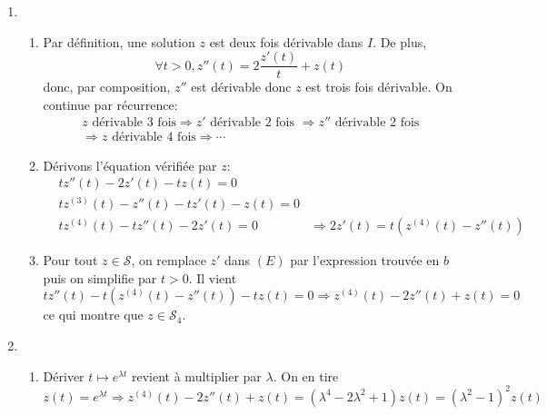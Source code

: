 \begin{enumerate}
  \item 
\begin{enumerate}
  \item Par définition, une solution $z$ est deux fois dérivable dans $I$. De plus,
\begin{displaymath}
  \forall t>0, z''(t) = 2\frac{z'(t)}{t} + z(t)
\end{displaymath}
donc, par composition, $z''$ est dérivable donc $z$ est trois fois dérivable. On continue par récurrence:
\begin{multline*}
  z \text{ dérivable 3 fois} \Rightarrow z' \text{ dérivable 2 fois } \Rightarrow z'' \text{ dérivable 2 fois} \\
  \Rightarrow z \text{ dérivable 4 fois} \Rightarrow \cdots
\end{multline*}

  \item Dérivons l'équation vérifiée par $z$:
\begin{align*}
  &tz''(t) - 2z'(t) - tz(t) = 0& \\
  &tz^{(3)}(t) - z''(t) -tz'(t) -z(t) = 0& \\
  &tz^{(4)}(t) - tz''(t) -2 z'(t) = 0& \Rightarrow 2z'(t) = t\left( z^{(4)}(t) - z''(t)\right) 
\end{align*}

  \item Pour tout $z\in \mathcal{S}$, on remplace $z'$ dans $(E)$ par l'expression trouvée en $b$ puis on simplifie par $t>0$. Il vient
\begin{displaymath}
  tz''(t) - t\left( z^{(4)}(t) - z''(t)\right) -tz(t)=0 \Rightarrow z^{(4)}(t) - 2z''(t) +z(t) = 0
\end{displaymath}
ce qui montre que $z\in \mathcal{S}_4$.
\end{enumerate}

  \item
\begin{enumerate}
  \item Dériver $t\mapsto e^{\lambda t}$ revient à multiplier par $\lambda$. On en tire
\begin{displaymath}
z(t) = e^{\lambda t} \Rightarrow z^{(4)}(t) - 2z''(t) + z(t) = (\lambda^4 -2\lambda^2+1)z(t) = (\lambda^2-1)^2z(t)  
\end{displaymath}


\end{enumerate}
\end{enumerate}
